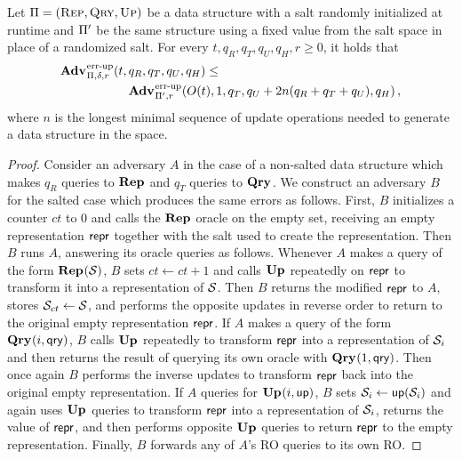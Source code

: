 {
\begin{lemma}\label{lemma:noinvsalt}
  Let $\mathrm{\Pi} = (\textnormal{\textsc{Rep}}, \textnormal{\textsc{Qry}}, \textnormal{\textsc{Up}})$ be a data structure with a salt randomly
  initialized at runtime and $\mathrm{\Pi}'$ be the same structure using a fixed
  value from the salt space in place of a randomized salt. For every $t, q_R,
  q_T, q_U, q_H, r\geq 0$, it holds that
  \begin{equation*}
    \begin{aligned}
    \Adv{\errep}_{\struct,\delta,r}(t,\,&q_R, q_T, q_U, q_H) \leq \\
      & \Adv{\errep}_{\struct',r}(O(t), 1, q_T, q_U+2n(q_R+q_T+q_U), q_H) \,,
    \end{aligned}
  \end{equation*}
  where $n$ is the longest minimal sequence of update operations needed to
  generate a data structure in the space.
\end{lemma}
\begin{proof}
%
Consider an adversary $A$ in the case of a non-salted data structure which makes
$q_R$ queries to $\textup{\textbf{Rep}}\hspace{0.5pt}$ and $q_T$ queries to $\textup{\textbf{Qry}}\hspace{0.5pt}$. We construct an adversary
$B$ for the salted case which produces the same errors as follows. First, $B$
initializes a counter $ct$ to 0 and calls the $\textup{\textbf{Rep}}\hspace{0.5pt}$ oracle on the empty set,
receiving an empty representation $\mathsf{repr}$ together with the salt used to create
the representation. Then $B$ runs $A$, answering its oracle queries as follows.
Whenever $A$ makes a query of the form $\textup{\textbf{Rep}}\hspace{0.5pt}(\mathcal{S})$, $B$ sets $ct \gets ct + 1$
and calls $\textup{\textbf{Up}}\hspace{0.5pt}$ repeatedly on $\mathsf{repr}$ to transform it into a representation of
$\mathcal{S}$. Then $B$ returns the modified $\mathsf{repr}$ to $A$, stores $\mathcal{S}_{ct} \gets
\mathcal{S}$, and performs the opposite updates in reverse order to return to the
original empty representation $\mathsf{repr}$. If $A$ makes a query of the form
$\textup{\textbf{Qry}}\hspace{0.5pt}(i,\mathsf{qry})$, $B$ calls $\textup{\textbf{Up}}\hspace{0.5pt}$ repeatedly to transform $\mathsf{repr}$ into a
representation of $\mathcal{S}_i$ and then returns the result of querying its own
oracle with $\textup{\textbf{Qry}}\hspace{0.5pt}(1, \mathsf{qry})$. Then once again $B$ performs the inverse updates
to transform $\mathsf{repr}$ back into the original empty representation. If $A$ queries
for $\textup{\textbf{Up}}\hspace{0.5pt}(i, \mathsf{up})$, $B$ sets $\mathcal{S}_i \gets \mathsf{up}(\mathcal{S}_i)$ and again uses $\textup{\textbf{Up}}\hspace{0.5pt}$
queries to transform $\mathsf{repr}$ into a representation of $\mathcal{S}_i$, returns the value
of $\mathsf{repr}$, and then performs opposite $\textup{\textbf{Up}}\hspace{0.5pt}$ queries to return $\mathsf{repr}$ to the
empty representation. Finally, $B$ forwards any of $A$'s RO queries to its own
RO.


\end{proof}}
